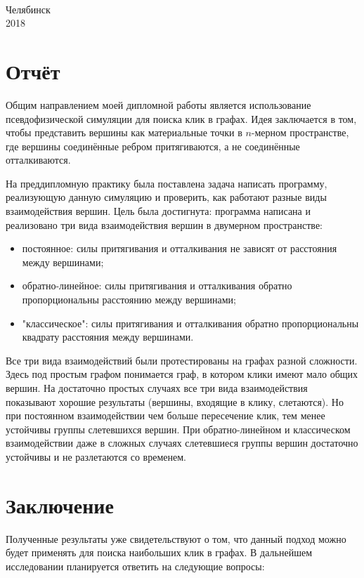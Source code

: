\documentclass[12pt,a4paper,titlepage]{article}
\theoremstyle{definition}
\begin{document}
\begin{titlepage}
\begin{center}
{\begin{tabular}[t]{lllllllllllllllllll}
\end{tabular}
\\[4.5cm]}

\small{Челябинск}\\
\small{2018}
\end{center}
\end{titlepage}
\tableofcontents
\section{Отчёт}

Общим направлением моей дипломной работы является использование псевдофизической
симуляции для поиска клик в графах.
Идея заключается в том, чтобы представить вершины как материальные точки в
$n$-мерном пространстве, где вершины соединённые ребром притягиваются, а не 
соединённые отталкиваются.

На преддипломную практику была поставлена задача написать программу, реализующую
данную симуляцию и проверить, как работают разные виды взаимодействия вершин.
Цель была достигнута: программа написана и реализовано три вида взаимодействия
вершин в двумерном пространстве:

\begin{itemize}
  \item постоянное: силы притягивания и отталкивания не зависят от расстояния
        между вершинами;
  \item обратно-линейное: силы притягивания и отталкивания обратно
        пропорциональны расстоянию между вершинами; 
  \item "классическое": силы притягивания и отталкивания обратно пропорциональны
        квадрату расстояния между вершинами.
\end{itemize}

Все три вида взаимодействий были протестированы на графах разной сложности.
Здесь под простым графом понимается граф, в котором клики имеют мало общих
вершин.
На достаточно простых случаях все три вида взаимодействия показывают хорошие
результаты (вершины, входящие в клику, слетаются).
Но при постоянном взаимодействии чем больше пересечение клик, тем менее
устойчивы группы слетевшихся вершин.
При обратно-линейном и классическом взаимодействии даже в сложных случаях
слетевшиеся группы вершин достаточно устойчивы и не разлетаются со временем.

\section{Заключение}
Полученные результаты уже свидетельствуют о том, что данный подход можно будет
применять для поиска наибольших клик в графах.
В дальнейшем исследовании планируется ответить на следующие вопросы:
\end{document}
